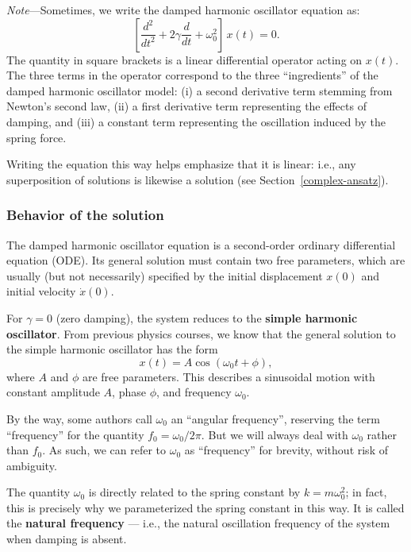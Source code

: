 \documentclass[10pt,a4paper]{article}
\begin{document}
\begin{framed}\noindent
  \textit{Note}---Sometimes, we write the damped harmonic oscillator
  equation as:
  \begin{equation}
    \left[\frac{d^2}{dt^2} + 2\gamma \frac{d}{dt} + \omega_0^2 \right]\, x(t) = 0.
  \end{equation}
  The quantity in square brackets is a linear differential operator
  acting on $x(t)$. The three terms in the operator correspond to the
  three ``ingredients'' of the damped harmonic oscillator model: (i) a
  second derivative term stemming from Newton's second law, (ii) a
  first derivative term representing the effects of damping, and (iii)
  a constant term representing the oscillation induced by the spring
  force.

  Writing the equation this way helps emphasize that it is linear:
  i.e., any superposition of solutions is likewise a solution (see
  Section~\ref{complex-ansatz}).
\end{framed}

\subsubsection{Behavior of the solution}
\label{behavior-of-the-solution}

The damped harmonic oscillator equation is a second-order ordinary
differential equation (ODE).  Its general solution must contain two
free parameters, which are usually (but not necessarily) specified by
the initial displacement $x(0)$ and initial velocity $\dot{x}(0)$.

For $\gamma = 0$ (zero damping), the system reduces to the
\textbf{simple harmonic oscillator}. From previous physics courses, we
know that the general solution to the simple harmonic oscillator has
the form
\begin{equation}
  x(t) = A \cos(\omega_0 t + \phi),
  \label{simple-gensol}
\end{equation}
where $A$ and $\phi$ are free parameters. This describes a sinusoidal
motion with constant amplitude $A$, phase $\phi$, and frequency
$\omega_0$.

By the way, some authors call $\omega_0$ an ``angular frequency'',
reserving the term ``frequency'' for the quantity $f_0 =
\omega_0/2\pi$. But we will always deal with $\omega_0$ rather than
$f_0$. As such, we can refer to $\omega_0$ as ``frequency'' for
brevity, without risk of ambiguity.

The quantity $\omega_0$ is directly related to the spring constant by
$k = m\omega_0^2$; in fact, this is precisely why we parameterized the
spring constant in this way. It is called the \textbf{natural
  frequency} --- i.e., the natural oscillation frequency of the system
when damping is absent.
\end{document}

